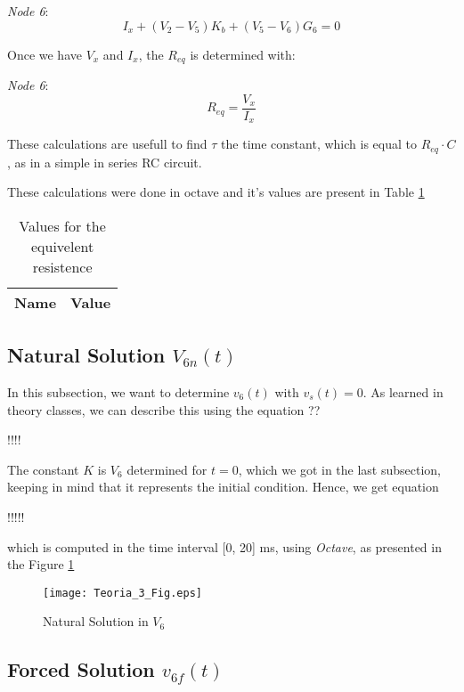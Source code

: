 \textit{Node 6}:
\begin{equation}
  I_{x} + (V_{2} - V_{5})K_{b} + (V_{5} - V_{6})G_{6} = 0
\end{equation}

Once we have $V_x$ and $I_x$, the $R_{eq}$ is determined with:


\textit{Node 6}:
\begin{equation}
  R_{eq} = \frac{V_x}{I_x}
\end{equation}

These calculations are usefull to find $\tau$ the time constant, which is equal to $R_{eq} \cdot C$, as in a simple in series RC circuit.

These calculations were done in octave and it's values are present in Table \ref{tabReq}

\begin{table}[!ht]
  \centering
  \begin{tabular}{|l|r|}
    \hline    
    {\bf Name} & {\bf Value} \\ \hline
    
  \end{tabular}
  \caption{Values for the equivelent resistence}
  \label{tabReq}
\end{table}


\subsection{Natural Solution $V_{6n}(t)$}
\label{subsec:Nat_Sol_theory}

In this subsection, we want to determine $v_6 (t)$ with $v_s(t) = 0$. As learned in theory classes, we can describe this using the equation ??

!!!!


The constant $K$ is $V_6$ determined for $t=0$, which we got in the last subsection, keeping in mind that it represents the initial condition. Hence, we get equation 

!!!!!

which is computed in the time interval [0, 20] ms, using \textit{Octave}, as presented in the Figure \ref{plot3}

\begin{figure}[h]
\centering
\caption{Natural Solution in $V_6$}
\texttt{[image: Teoria\_3\_Fig.eps]}
\label{plot3}
\end{figure}

\newpage

\subsection{Forced Solution $v_{6f}(t)$}
\label{subsec:Forced_Sol_theory}


